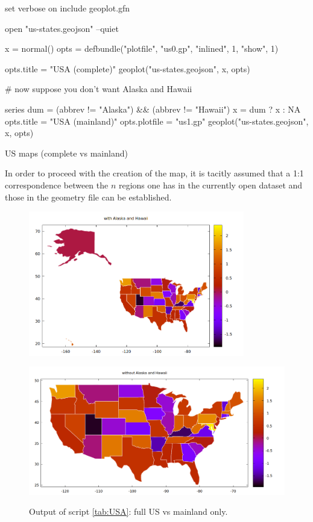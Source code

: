 \documentclass{article}
\begin{document}
\begin{table}[htbp]
  \begin{scode}
set verbose on
include geoplot.gfn

open "us-states.geojson" --quiet

x = normal()
opts = defbundle("plotfile", "us0.gp", "inlined", 1, "show", 1)

opts.title = "USA (complete)"
geoplot("us-states.geojson", x, opts)

# now suppose you don't want Alaska and Hawaii

series dum = (abbrev != "Alaska") && (abbrev != "Hawaii")
x = dum ? x : NA
opts.title = "USA (mainland)"
opts.plotfile = "us1.gp"
geoplot("us-states.geojson", x, opts)
  \end{scode}
  \caption{US maps (complete vs mainland)}
  \label{tab:USA}
\end{table}

In order to proceed with the creation of the map, it is tacitly
assumed that a 1:1 correspondence between the $n$ regions one has in
the currently open dataset and those in the geometry file can be
established.

\begin{figure}[htbp]
  \begin{center}
  \includegraphics[height=180pt]{us0.png}

  \includegraphics[height=180pt]{us1.png}  
\end{center}
\caption{Output of script \ref{tab:USA}: full US vs mainland only.}
\label{fig:USA}
\end{figure}
\end{document}
